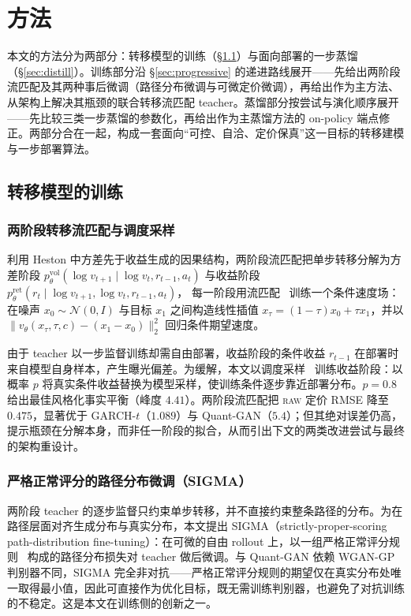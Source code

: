 \documentclass[11pt]{ctexart}
\newcommand{\raw}{\textsc{raw}}
\begin{document}
\section{方法}
\label{sec:method}

本文的方法分为两部分：转移模型的训练（\S\ref{sec:train}）与面向部署的一步蒸馏（\S\ref{sec:distill}）。训练部分沿 \S\ref{sec:progressive} 的递进路线展开——先给出两阶段流匹配及其两种事后微调（路径分布微调与可微定价微调），再给出作为主方法、从架构上解决其瓶颈的联合转移流匹配 teacher。蒸馏部分按尝试与演化顺序展开——先比较三类一步蒸馏的参数化，再给出作为主蒸馏方法的 on-policy 端点修正。两部分合在一起，构成一套面向“可控、自洽、定价保真”这一目标的转移建模与一步部署算法。

\subsection{转移模型的训练}
\label{sec:train}

\subsubsection{两阶段转移流匹配与调度采样}
\label{sec:twostage}
利用 Heston 中方差先于收益生成的因果结构，两阶段流匹配把单步转移分解为方差阶段
$p^{\mathrm{vol}}_\theta(\log v_{t+1}\mid \log v_t,r_{t-1},a_t)$
与收益阶段
$p^{\mathrm{ret}}_\theta(r_t\mid \log v_{t+1},\log v_t,r_{t-1},a_t)$，
每一阶段用流匹配~\citep{lipman2023flow,liu2023rectified} 训练一个条件速度场：在噪声 $x_0\sim\mathcal N(0,I)$ 与目标 $x_1$ 之间构造线性插值 $x_\tau=(1-\tau)x_0+\tau x_1$，并以 $\|v_\theta(x_\tau,\tau,c)-(x_1-x_0)\|_2^2$ 回归条件期望速度。

由于 teacher 以一步监督训练却需自由部署，收益阶段的条件收益 $r_{t-1}$ 在部署时来自模型自身样本，产生曝光偏差。为缓解，本文以调度采样~\citep{bengio2015scheduled} 训练收益阶段：以概率 $p$ 将真实条件收益替换为模型采样，使训练条件逐步靠近部署分布。$p=0.8$ 给出最佳风格化事实平衡（峰度 $4.41$）。两阶段流匹配把 \raw{} 定价 RMSE 降至 $0.475$，显著优于 GARCH-$t$（$1.089$）与 Quant-GAN（$5.4$）；但其绝对误差仍高，提示瓶颈在分解本身，而非任一阶段的拟合，从而引出下文的两类改进尝试与最终的架构重设计。

\subsubsection{严格正常评分的路径分布微调（SIGMA）}
\label{sec:sigma}
两阶段 teacher 的逐步监督只约束单步转移，并不直接约束整条路径的分布。为在路径层面对齐生成分布与真实分布，本文提出 SIGMA（strictly-proper-scoring path-distribution fine-tuning）：在可微的自由 rollout 上，以一组严格正常评分规则~\citep{gneiting2007strictly} 构成的路径分布损失对 teacher 做后微调。与 Quant-GAN 依赖 WGAN-GP 判别器不同，SIGMA 完全非对抗——严格正常评分规则的期望仅在真实分布处唯一取得最小值，因此可直接作为优化目标，既无需训练判别器，也避免了对抗训练的不稳定。这是本文在训练侧的创新之一。
\end{document}
